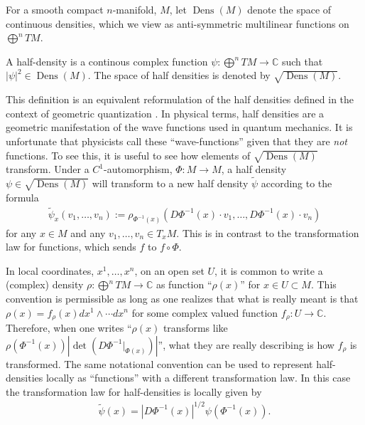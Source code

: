\documentclass[final,leqno]{siamltex1213}
\DeclareMathOperator{\Dens}{Dens}
\begin{document}
For a smooth compact $n$-manifold, $M$, let $\Dens(M)$ denote the space of continuous densities, which we view as anti-symmetric multilinear functions on $\bigoplus^n TM$.
\begin{definition}\label{def:half density}
	A half-density is a continous complex function $\psi : \bigoplus^n TM \to \mathbb{C}$
	such that $| \psi |^{2} \in \Dens(M)$.
	The space of half densities is denoted by $\sqrt{\Dens(M)}$.
\end{definition}

This definition is an equivalent reformulation of the half densities defined in the context of geometric quantization \cite{GuilleminSternberg1970,BatesWeinstein1997}.
In physical terms, half densities are a geometric manifestation of the wave functions used in quantum mechanics.
It is unfortunate that physicists call these ``wave-functions'' given that they are \emph{not} functions.
To see this, it is useful to see how elements of $\sqrt{\Dens(M)}$ transform.
Under a $C^{1}$-automorphism, $\Phi: M \to M$,
a half density $\psi \in \sqrt{ \Dens(M) }$ will transform to a new half density $\tilde{\psi}$ according to the formula
\begin{align}
	\tilde{\psi}_{x}(v_{1},\dots,v_{n}) := \rho_{ \Phi^{-1}(x) } ( D\Phi^{-1}(x) \cdot v_{1} , \dots , D\Phi^{-1}(x) \cdot v_{n} ) \label{eq:transformation law}
\end{align}
for any $x \in M$ and any $v_{1}, \dots , v_{n} \in T_{x}M$.
This is in contrast to the transformation law for functions, which sends $f$ to $f \circ \Phi$. 

In local coordinates, $x^{1},\dots,x^{n}$, on an open set $U$, it is common to write a (complex) density $\rho: \bigoplus^{n}TM \to \mathbb{C}$ as function ``$\rho(x)$'' for $x \in U \subset M$.
This convention is permissible as long as one realizes that what is really meant is that $\rho(x) = f_{\rho}(x) dx^{1} \wedge \cdots dx^{n}$ for some complex valued function $f_{\rho}:U \to \mathbb{C}$.
Therefore, when one writes  ``$\rho(x)$ transforms like $\rho( \Phi^{-1}(x)) \left| \det( D \Phi^{-1}|_{\Phi(x)} ) \right|$'', what they are really describing is how $f_{\rho}$ is transformed.
The same notational convention can be used to represent half-densities locally as ``functions'' with a different transformation law.
In this case the transformation law for half-densities is locally given by
\begin{align}
	\tilde{\psi}(x) = \left| D\Phi^{-1} (x) \right|^{1/2} \psi \left( \Phi^{-1}(x) \right). \label{eq:local transformation law}
\end{align}
\end{document}

